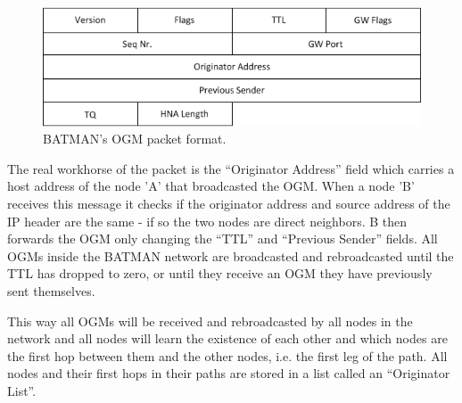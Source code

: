 \begin{figure}[h]
	\centering
  	\includegraphics[width=\textwidth]{images/original_ogm.png}
  	\caption{BATMAN's \acf{OGM} packet format.}
	\label{fig:original_ogm}
\end{figure}

The real workhorse of the packet is the ``Originator Address'' field which
carries a host address of the node 'A' that broadcasted the \ac{OGM}. When a
node 'B' receives this message it checks if the originator address and source
address of the IP header are the same - if so the two nodes are direct
neighbors. B then forwards the \ac{OGM} only changing the ``\ac{TTL}'' and
``Previous Sender'' fields. All \acp{OGM} inside the BATMAN network are
broadcasted and rebroadcasted until the TTL has dropped to zero, or until they
receive an \ac{OGM} they have previously sent themselves.

This way all \acp{OGM} will be received and rebroadcasted by all nodes in the
network and all nodes will learn the existence of each other and which nodes are
the first hop between them and the other nodes, i.e. the first leg of the path.
All nodes and their first hops in their paths are stored in a list called an
``Originator List''.

